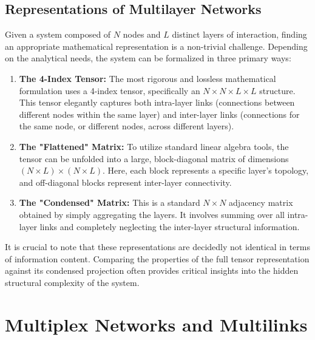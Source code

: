 \subsection{Representations of Multilayer Networks}
\label{subsec:representation_multilayer}

Given a system composed of \(N\) nodes and \(L\) distinct layers of interaction, finding an appropriate mathematical representation is a non-trivial challenge. Depending on the analytical needs, the system can be formalized in three primary ways:

\begin{enumerate}
    \item \textbf{The 4-Index Tensor:} The most rigorous and lossless mathematical formulation uses a 4-index tensor, specifically an \(N \times N \times L \times L\) structure. This tensor elegantly captures both intra-layer links (connections between different nodes within the same layer) and inter-layer links (connections for the same node, or different nodes, across different layers).
    \item \textbf{The "Flattened" Matrix:} To utilize standard linear algebra tools, the tensor can be unfolded into a large, block-diagonal matrix of dimensions \((N \times L) \times (N \times L)\). Here, each block represents a specific layer's topology, and off-diagonal blocks represent inter-layer connectivity.
    \item \textbf{The "Condensed" Matrix:} This is a standard \(N \times N\) adjacency matrix obtained by simply aggregating the layers. It involves summing over all intra-layer links and completely neglecting the inter-layer structural information.
\end{enumerate}


It is crucial to note that these representations are decidedly not identical in terms of information content. Comparing the properties of the full tensor representation against its condensed projection often provides critical insights into the hidden structural complexity of the system.

\section{Multiplex Networks and Multilinks}
\label{sec:multiplex_networks}

